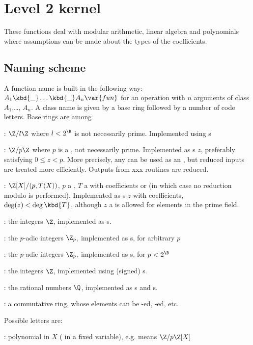 \newpage
\chapter{Level 2 kernel}

These functions deal with modular arithmetic, linear algebra and polynomials
where assumptions can be made about the types of the coefficients.

\section{Naming scheme}\label{se:level2names}
A function name is built in the following way:
$A_1\kbd{\_}\dots\kbd{\_}A_n\var{fun}$ for an operation  with $n$
arguments of class $A_1$,\dots, $A_n$. A class name is given by a base ring
followed by a number of code letters. Base rings are among

  : $\Z/l\Z$ where $l < 2^{\B}$ is not necessarily prime. Implemented
            using s

  : $\Z/p\Z$ where $p$ is a , not necessarily prime.
Implemented as s $z$, preferably satisfying $0 \leq z < p$.
More precisely, any  can be used as an , but reduced
inputs are treated more efficiently. Outputs from xxx routines are
reduced.

  : $\Z[X]/(p,T(X))$, $p$ a , $T$ a  with 
coefficients or  (in which case no reduction modulo  is
performed). Implemented as s $z$ with  coefficients,
$\deg(z) < \deg \kbd{T}$, although $z$ a  is allowed for elements in
the prime field.

  :  the integers $\Z$, implemented as s.

  : the $p$-adic integers $\Z_p$, implemented as s, for arbitrary $p$

  : the $p$-adic integers $\Z_p$, implemented as s, for $p< 2^{\B}$

  :  the integers $\Z$, implemented using (signed) s.

  :  the rational numbers $\Q$, implemented as s and
s.

  :  a commutative ring, whose elements can be
-ed, -ed, etc.

\noindent Possible letters are:

  : polynomial in $X$ ( in a fixed variable), e.g. 
           means $\Z/p\Z[X]$

